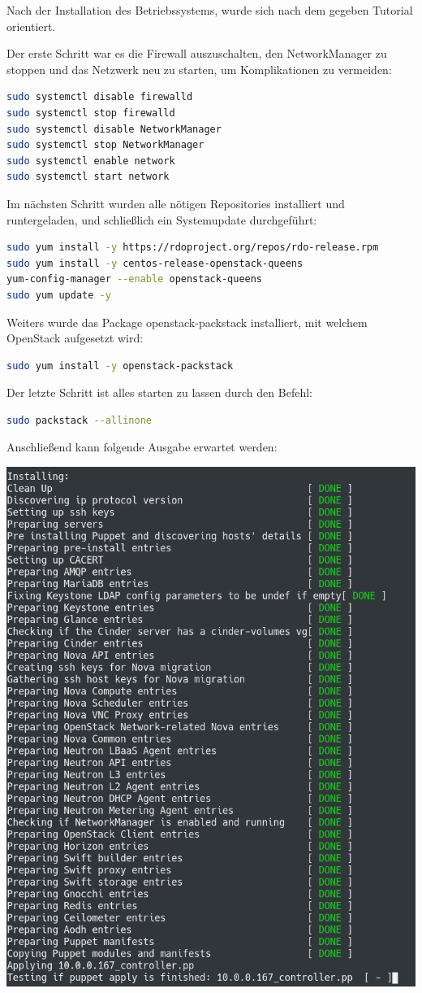 Nach der Installation des Betriebssystems, wurde sich nach dem gegeben Tutorial \cite{Packstac62:online} orientiert. 

Der erste Schritt war es die Firewall auszuschalten, den NetworkManager zu stoppen und das Netzwerk neu zu starten, um Komplikationen zu vermeiden:

\begin{lstlisting}[language=bash]
sudo systemctl disable firewalld
sudo systemctl stop firewalld
sudo systemctl disable NetworkManager
sudo systemctl stop NetworkManager
sudo systemctl enable network
sudo systemctl start network
\end{lstlisting}

Im nächsten Schritt wurden alle nötigen Repositories installiert und runtergeladen, und schließlich ein Systemupdate durchgeführt:

\begin{lstlisting}[language=bash]
sudo yum install -y https://rdoproject.org/repos/rdo-release.rpm
sudo yum install -y centos-release-openstack-queens
yum-config-manager --enable openstack-queens
sudo yum update -y
\end{lstlisting}

Weiters wurde das Package openstack-packstack installiert, mit welchem OpenStack aufgesetzt wird:

\begin{lstlisting}[language=bash]
sudo yum install -y openstack-packstack
\end{lstlisting}

Der letzte Schritt ist alles starten zu lassen durch den Befehl:

\begin{lstlisting}[language=bash]
sudo packstack --allinone
\end{lstlisting}

Anschließend kann folgende Ausgabe erwartet werden:

\begin{minipage}{\linewidth}
	\centering
	\includegraphics[width=0.53\linewidth]{images/packstack}
\end{minipage}

